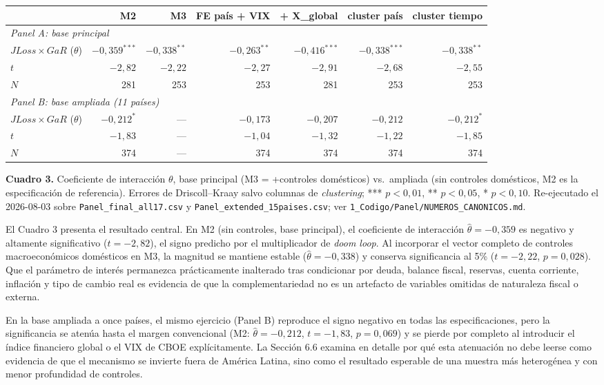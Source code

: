 \documentclass[5p,times,twocolumn,authoryear]{elsarticle}
\begin{document}
\begin{table}[t]
\centering
\small
\begin{tabular}{lrrrrrr}
\toprule
 & M2 & M3 & FE país + VIX & + X\_global & cluster país & cluster tiempo \\
\midrule
\multicolumn{7}{l}{\textit{Panel A: base principal}} \\
$JLoss\times GaR$ ($\theta$) & $-0,359^{***}$ & $-0,338^{**}$ & $-0,263^{**}$ & $-0,416^{***}$ & $-0,338^{***}$ & $-0,338^{**}$ \\
$t$ & $-2,82$ & $-2,22$ & $-2,27$ & $-2,91$ & $-2,68$ & $-2,55$ \\
$N$ & 281 & 253 & 253 & 281 & 253 & 253 \\
\midrule
\multicolumn{7}{l}{\textit{Panel B: base ampliada (11 países)}} \\
$JLoss\times GaR$ ($\theta$) & $-0,212^{*}$ & --- & $-0,173$ & $-0,207$ & $-0,212$ & $-0,212^{*}$ \\
$t$ & $-1,83$ & --- & $-1,04$ & $-1,32$ & $-1,22$ & $-1,85$ \\
$N$ & 374 & --- & 374 & 374 & 374 & 374 \\
\bottomrule
\end{tabular}
\smallskip
\small\textbf{Cuadro 3.} Coeficiente de interacción $\theta$, base principal (M3 = +controles domésticos) vs.\ ampliada (sin controles domésticos, M2 es la especificación de referencia). Errores de Driscoll–Kraay salvo columnas de \textit{clustering}; *** $p<0{,}01$, ** $p<0{,}05$, * $p<0{,}10$. Re-ejecutado el 2026-08-03 sobre \texttt{Panel\_final\_all17.csv} y \texttt{Panel\_extended\_15paises.csv}; ver \texttt{1\_Codigo/Panel/NUMEROS\_CANONICOS.md}.
\end{table}

El Cuadro 3 presenta el resultado central. En M2 (sin controles, base principal), el coeficiente de interacción $\hat\theta=-0{,}359$ es negativo y altamente significativo ($t=-2{,}82$), el signo predicho por el multiplicador de \textit{doom loop}. Al incorporar el vector completo de controles macroeconómicos domésticos en M3, la magnitud se mantiene estable ($\hat\theta=-0{,}338$) y conserva significancia al 5\% ($t=-2{,}22$, $p=0{,}028$). Que el parámetro de interés permanezca prácticamente inalterado tras condicionar por deuda, balance fiscal, reservas, cuenta corriente, inflación y tipo de cambio real es evidencia de que la complementariedad no es un artefacto de variables omitidas de naturaleza fiscal o externa.

En la base ampliada a once países, el mismo ejercicio (Panel B) reproduce el signo negativo en todas las especificaciones, pero la significancia se atenúa hasta el margen convencional (M2: $\hat\theta=-0{,}212$, $t=-1{,}83$, $p=0{,}069$) y se pierde por completo al introducir el índice financiero global o el VIX de CBOE explícitamente. La Sección 6.6 examina en detalle por qué esta atenuación no debe leerse como evidencia de que el mecanismo se invierte fuera de América Latina, sino como el resultado esperable de una muestra más heterogénea y con menor profundidad de controles.
\end{document}
